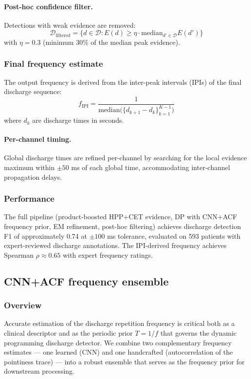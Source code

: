 \paragraph{Post-hoc confidence filter.}
Detections with weak evidence are removed:
\[ \mathcal{D}_{\mathrm{filtered}} = \big\{d \in \mathcal{D} : E(d) \geq \eta \cdot \mathrm{median}_{d' \in \mathcal{D}} E(d')\big\} \tag{11} \]
with $\eta = 0.3$ (minimum 30\% of the median peak evidence).

\subsubsection{Final frequency estimate}

The output frequency is derived from the inter-peak intervals (IPIs) of the final discharge sequence:
\[ f_{\mathrm{IPI}} = \frac{1}{\mathrm{median}\!\big(\{d_{k+1} - d_k\}_{k=1}^{K-1}\big)} \tag{12} \]
where $d_k$ are discharge times in seconds.

\paragraph{Per-channel timing.}
Global discharge times are refined per-channel by searching for the local evidence maximum within $\pm 50$ ms of each global time, accommodating inter-channel propagation delays.

\subsubsection{Performance}

The full pipeline (product-boosted HPP+CET evidence, DP with CNN+ACF frequency prior, EM refinement, post-hoc filtering) achieves discharge detection F1 of approximately 0.74 at $\pm 100$ ms tolerance, evaluated on 593 patients with expert-reviewed discharge annotations. The IPI-derived frequency achieves Spearman $\rho \approx 0.65$ with expert frequency ratings.

\subsection{CNN+ACF frequency ensemble}
\label{app:cnn_acf}

\subsubsection{Overview}

Accurate estimation of the discharge repetition frequency is critical both as a clinical descriptor and as the periodic prior $T = 1/f$ that governs the dynamic programming discharge detector. We combine two complementary frequency estimates --- one learned (CNN) and one handcrafted (autocorrelation of the pointiness trace) --- into a robust ensemble that serves as the frequency prior for downstream processing.

